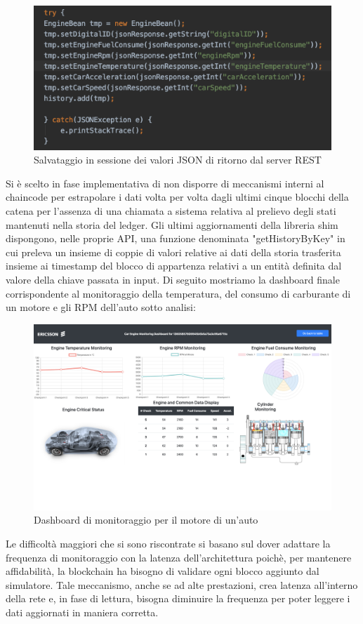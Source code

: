 \begin{figure}[h]
    \centering
    \includegraphics[width=1\textwidth]{img/history_screen.png}
    \caption{Salvataggio in sessione dei valori JSON di ritorno dal server REST}
    \label{fig:session_history}
\end{figure}
Si è scelto in fase implementativa di non disporre di meccanismi interni al chaincode per estrapolare i dati volta per volta dagli ultimi cinque blocchi della catena per l'assenza di una chiamata a sistema relativa al prelievo degli stati mantenuti nella storia del ledger. Gli ultimi aggiornamenti della libreria shim dispongono, nelle proprie API, una funzione denominata "getHistoryByKey" in cui preleva un insieme di coppie di valori relative ai dati della storia trasferita insieme ai timestamp del blocco di appartenza relativi a un entità definita dal valore della chiave passata in input. Di seguito mostriamo la dashboard finale corrispondente al monitoraggio della temperatura, del consumo di carburante di un motore e gli RPM dell'auto sotto analisi:
\newpage
\begin{figure}[h]
    \centering
    \includegraphics[width=1\textwidth]{img/engine_monitoring.png}
    \caption{Dashboard di monitoraggio per il motore di un'auto}
    \label{fig:dashboard_automotive}
\end{figure}
Le difficoltà maggiori che si sono riscontrate si basano sul dover adattare la frequenza di monitoraggio con la latenza dell'architettura poichè, per mantenere affidabilità, la blockchain ha bisogno di validare ogni blocco aggiunto dal simulatore. Tale meccanismo, anche se ad alte prestazioni, crea latenza all'interno della rete e, in fase di lettura, bisogna diminuire la frequenza per poter leggere i dati aggiornati in maniera corretta. 
\newpage
